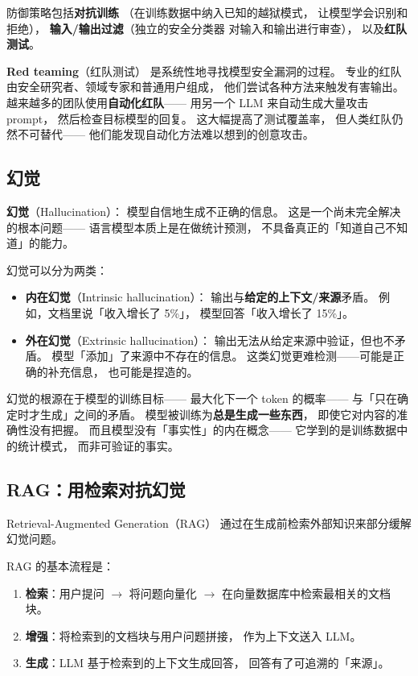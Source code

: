 防御策略包括\textbf{对抗训练}
（在训练数据中纳入已知的越狱模式，
让模型学会识别和拒绝），
\textbf{输入/输出过滤}（独立的安全分类器
对输入和输出进行审查），
以及\textbf{红队测试}。

\textbf{Red teaming}（红队测试）
是系统性地寻找模型安全漏洞的过程。
专业的红队由安全研究者、领域专家和普通用户组成，
他们尝试各种方法来触发有害输出。
越来越多的团队使用\textbf{自动化红队}——
用另一个 LLM 来自动生成大量攻击 prompt，
然后检查目标模型的回复。
这大幅提高了测试覆盖率，
但人类红队仍然不可替代——
他们能发现自动化方法难以想到的创意攻击。

\subsection{幻觉}

\textbf{幻觉}（Hallucination）：
模型自信地生成不正确的信息。
这是一个尚未完全解决的根本问题——
语言模型本质上是在做统计预测，
不具备真正的「知道自己不知道」的能力。

幻觉可以分为两类：
\begin{itemize}[noitemsep]
  \item \textbf{内在幻觉}（Intrinsic hallucination）：
        输出与\textbf{给定的上下文/来源}矛盾。
        例如，文档里说「收入增长了 5\%」，
        模型回答「收入增长了 15\%」。
  \item \textbf{外在幻觉}（Extrinsic hallucination）：
        输出无法从给定来源中验证，但也不矛盾。
        模型「添加」了来源中不存在的信息。
        这类幻觉更难检测——可能是正确的补充信息，
        也可能是捏造的。
\end{itemize}

幻觉的根源在于模型的训练目标——
最大化下一个 token 的概率——
与「只在确定时才生成」之间的矛盾。
模型被训练为\textbf{总是生成一些东西}，
即使它对内容的准确性没有把握。
而且模型没有「事实性」的内在概念——
它学到的是训练数据中的统计模式，
而非可验证的事实。

\subsection{RAG：用检索对抗幻觉}

Retrieval-Augmented Generation（RAG）
通过在生成前检索外部知识来部分缓解幻觉问题。

RAG 的基本流程是：
\begin{enumerate}[noitemsep]
  \item \textbf{检索}：用户提问 $\to$ 将问题向量化 $\to$
        在向量数据库中检索最相关的文档块。
  \item \textbf{增强}：将检索到的文档块与用户问题拼接，
        作为上下文送入 LLM。
  \item \textbf{生成}：LLM 基于检索到的上下文生成回答，
        回答有了可追溯的「来源」。
\end{enumerate}

